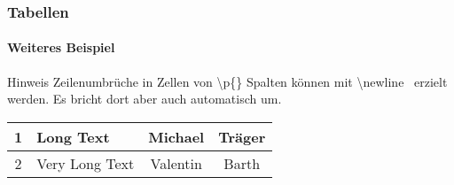 

\begin{frame}[t]

\frametitle{Tabellen}
\framesubtitle{Weiteres Beispiel}

\begin{block}{Hinweis}
Zeilenumbrüche in Zellen von \color{nounibaredI}\textbackslash p\color{black}\{\} Spalten können mit \color{nounibaredI}\textbackslash newline\color{black}~ erzielt werden. Es bricht dort aber auch automatisch um.
\end{block}

\medskip

\begin{footnotesize}
\begin{ttfamily}

\end{ttfamily}
\end{footnotesize}

\medskip

\begin{tabular}{|c|p{20mm}|c|c|}
\hline
1 & Long \newline Text & Michael & Träger \\
\hline
2 & Very Long Text & Valentin & Barth \\
\hline
\end{tabular}

\end{frame}




